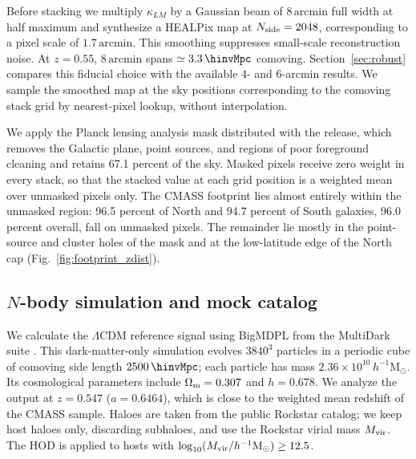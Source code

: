 Before stacking we multiply $\kappa_{LM}$ by a Gaussian beam of
$8\,\mathrm{arcmin}$ full width at half maximum and synthesize a HEALPix map
\citep{Gorski2005} at $N_{\rm side}=2048$, corresponding to a pixel scale of
$1.7\,\mathrm{arcmin}$. This smoothing suppresses small-scale reconstruction
noise. At $z=0.55$, $8\,\mathrm{arcmin}$ spans
$\simeq3.3\,\hinvMpc$ comoving. Section~\ref{sec:robust} compares this
fiducial choice with the available $4$- and $6$-arcmin results. We sample the
smoothed map at the sky positions
corresponding to the comoving stack grid by nearest-pixel lookup, without
interpolation.

We apply the Planck lensing analysis mask distributed with the release,
which removes the Galactic plane, point sources, and regions of poor
foreground cleaning and retains 67.1 percent of the sky. Masked pixels
receive zero weight in every stack, so that the stacked value at each grid
position is a weighted mean over unmasked pixels only. The CMASS footprint
lies almost entirely within the unmasked region: 96.5 percent of North and
94.7 percent of South galaxies, 96.0 percent overall, fall on unmasked
pixels. The remainder lie mostly in the point-source and cluster holes of the
mask and at the low-latitude edge of the North cap
(Fig.~\ref{fig:footprint_zdist}).

\subsection{$N$-body simulation and mock catalog}
\label{sec:sim}

We calculate the $\Lambda$CDM reference signal using BigMDPL from the
MultiDark suite \citep{Klypin2016, Riebe2013}. This dark-matter-only simulation
evolves $3840^{3}$ particles in a periodic cube of comoving side length
$2500\,\hinvMpc$; each particle has mass
$2.36\times10^{10}\,h^{-1}\mathrm{M}_{\odot}$. Its cosmological parameters
include $\Omega_{\rm m}=0.307$ and $h=0.678$. We analyze the output at
$z=0.547$ ($a=0.6464$), which is close to the weighted mean redshift of the
CMASS sample. Haloes
are taken from the public Rockstar catalog; we keep host haloes only,
discarding subhaloes, and use the Rockstar virial mass $M_{\rm vir}$. The
HOD is applied to hosts with
$\log_{10}(M_{\rm vir}/h^{-1}\mathrm{M}_{\odot})\geq12.5$.

